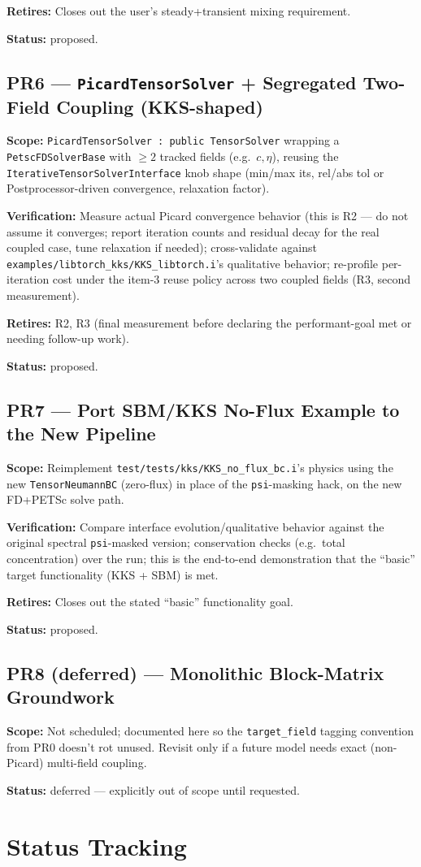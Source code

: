 \documentclass[11pt]{article}
\newcommand{\pr}[2]{\subsection{PR#1 --- #2}}
\newcommand{\status}[1]{\textcolor{marlinteal}{\textbf{Status:}} #1}
\begin{document}
\textbf{Retires:} Closes out the user's steady+transient mixing
requirement.

\status{proposed.}

\pr{6}{\texttt{PicardTensorSolver} + Segregated Two-Field Coupling (KKS-shaped)}
\textbf{Scope:} \texttt{PicardTensorSolver : public TensorSolver} wrapping a
\texttt{PetscFDSolverBase} with $\geq 2$ tracked fields (e.g.\ $c, \eta$),
reusing the \texttt{IterativeTensorSolverInterface} knob shape (min/max its,
rel/abs tol or Postprocessor-driven convergence, relaxation factor).

\textbf{Verification:} Measure actual Picard convergence behavior (this is
R2 --- do not assume it converges; report iteration counts and residual
decay for the real coupled case, tune relaxation if needed); cross-validate
against \texttt{examples/libtorch\_kks/KKS\_libtorch.i}'s qualitative
behavior; re-profile per-iteration cost under the item-3 reuse policy
across two coupled fields (R3, second measurement).

\textbf{Retires:} R2, R3 (final measurement before declaring the
performant-goal met or needing follow-up work).

\status{proposed.}

\pr{7}{Port SBM/KKS No-Flux Example to the New Pipeline}
\textbf{Scope:} Reimplement \texttt{test/tests/kks/KKS\_no\_flux\_bc.i}'s
physics using the new \texttt{TensorNeumannBC} (zero-flux) in place of the
\texttt{psi}-masking hack, on the new FD+PETSc solve path.

\textbf{Verification:} Compare interface evolution/qualitative behavior
against the original spectral \texttt{psi}-masked version; conservation
checks (e.g.\ total concentration) over the run; this is the end-to-end
demonstration that the ``basic'' target functionality (KKS + SBM) is met.

\textbf{Retires:} Closes out the stated ``basic'' functionality goal.

\status{proposed.}

\pr{8 (deferred)}{Monolithic Block-Matrix Groundwork}
\textbf{Scope:} Not scheduled; documented here so the \texttt{target\_field}
tagging convention from PR0 doesn't rot unused. Revisit only if a future
model needs exact (non-Picard) multi-field coupling.

\status{deferred --- explicitly out of scope until requested.}

\section{Status Tracking}
\end{document}
